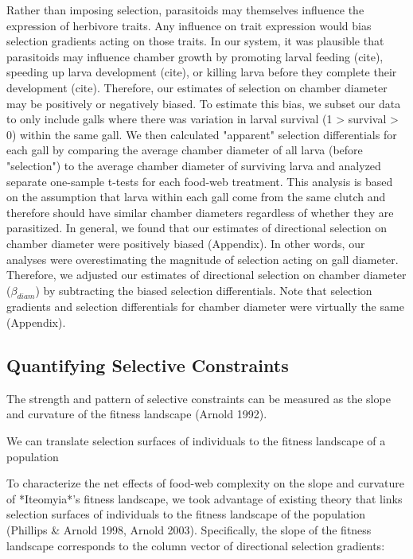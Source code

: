 \documentclass[11pt]{article}
\begin{document}
Rather than imposing selection, parasitoids may themselves influence the expression of herbivore traits. Any influence on trait expression would bias selection gradients acting on those traits. In our system, it was plausible that parasitoids may influence chamber growth by promoting larval feeding (cite), speeding up larva development (cite), or killing larva before they complete their development (cite). Therefore, our estimates of selection on chamber diameter may be positively or negatively biased. To estimate this bias, we subset our data to only include galls where there was variation in larval survival (1 > survival > 0) within the same gall. We then calculated "apparent" selection differentials for each gall by comparing the average chamber diameter of all larva (before "selection") to the average chamber diameter of surviving larva and analyzed separate one-sample t-tests for each food-web treatment. This analysis is based on the assumption that larva within each gall come from the same clutch and therefore should have similar chamber diameters regardless of whether they are parasitized. In general, we found that our estimates of directional selection on chamber diameter were positively biased (Appendix). In other words, our analyses were overestimating the magnitude of selection acting on gall diameter. Therefore, we adjusted our estimates of directional selection on chamber diameter ($\beta_{diam}$) by subtracting the biased selection differentials. Note that selection gradients and selection differentials for chamber diameter were virtually the same (Appendix). 

\subsection*{Quantifying Selective Constraints}

The strength and pattern of selective constraints can be measured as the slope and curvature of the fitness landscape (Arnold 1992).

We can translate selection surfaces of individuals to the fitness landscape of a population

To characterize the net effects of food-web complexity on the slope and curvature of *Iteomyia*'s fitness landscape, we took advantage of existing theory that links selection surfaces of individuals to the fitness landscape of the population (Phillips & Arnold 1998, Arnold 2003). Specifically, the slope of the fitness landscape corresponds to the column vector of directional selection gradients:
\end{document}
